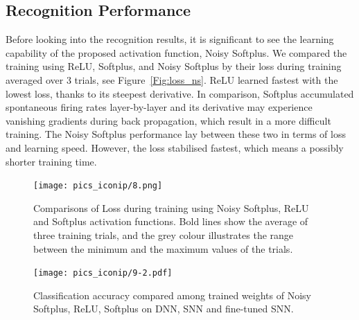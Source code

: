 \documentclass{article}
\begin{document}
\subsection{Recognition Performance}
\label{subsec:result_compare}
Before looking into the recognition results, it is significant to see the learning capability of the proposed activation function, Noisy Softplus.
We compared the training using ReLU, Softplus, and Noisy Softplus by their loss during training averaged over 3 trials, see Figure~\ref{Fig:loss_ns}.
ReLU learned fastest with the lowest loss, thanks to its steepest derivative.
In comparison, Softplus accumulated spontaneous firing rates layer-by-layer and its derivative may experience vanishing gradients during back propagation, which result in a more difficult training.
The Noisy Softplus performance lay between these two in terms of loss and learning speed.
However, the loss stabilised fastest, which means a possibly shorter training time.

\begin{figure}
	\begin{minipage}[t]{0.48\linewidth}
		\raggedleft
		\texttt{[image: pics\_iconip/8.png]}
		\caption{Comparisons of Loss during training using Noisy Softplus, ReLU and Softplus activation functions. Bold lines show the average of three training trials, and the grey colour illustrates the range between the minimum and the maximum values of the trials. }
		\label{Fig:loss_ns}
	\end{minipage}%
    \hspace{0.04\linewidth}
	\begin{minipage}[t]{0.48\linewidth}
		\raggedright
		\texttt{[image: pics\_iconip/9-2.pdf]}
		\caption{Classification accuracy compared among trained weights of Noisy Softplus, ReLU, Softplus on DNN, SNN and fine-tuned SNN.}
		\label{Fig:result_bar}
	\end{minipage}
\end{figure}
\end{document}
